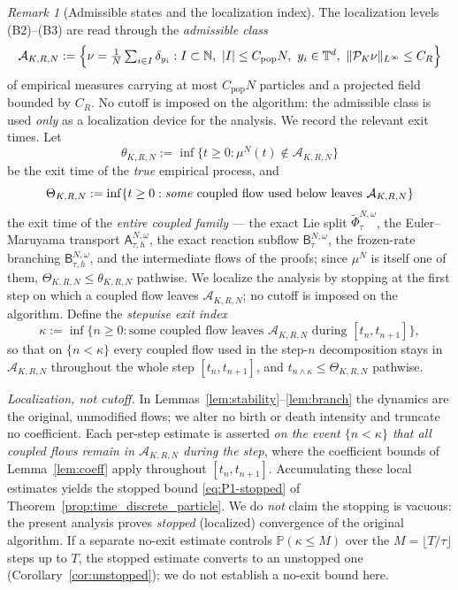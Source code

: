\documentclass[a4paper,fleqn]{cas-sc}
\theoremstyle{definition}
\theoremstyle{remark}
\newtheorem{remark}[theorem]{Remark}
\begin{document}
\begin{remark}[Admissible states and the localization index]\label{rem:admissible}
The localization levels (B2)--(B3) are read through the \emph{admissible class}
\[
\mathcal A_{K,R,N}:=\Bigl\{\nu=\tfrac1N\textstyle\sum_{i\in I}\delta_{y_i}:
I\subset\mathbb N,\ |I|\le C_{\mathrm{pop}}N,\ y_i\in\mathbb T^d,\ \|\mathcal P_K\nu\|_{L^\infty}\le C_R\Bigr\}
\]
of empirical measures carrying at most $C_{\mathrm{pop}}N$ particles and a projected field bounded
by $C_R$. No cutoff is imposed on the algorithm: the admissible class is used \emph{only} as a
localization device for the analysis. We record the relevant exit times. Let
\[
\theta_{K,R,N}:=\inf\{t\ge0:\mu^N(t)\notin\mathcal A_{K,R,N}\}
\]
be the exit time of the \emph{true} empirical process, and
\[
\Theta_{K,R,N}:=\inf\{t\ge0:\text{\emph{some} coupled flow used below leaves }\mathcal A_{K,R,N}\}
\]
the exit time of the \emph{entire coupled family} --- the exact Lie split
$\widetilde\Phi^{N,\omega}_\tau$, the Euler--Maruyama transport $\mathsf A^{N,\omega}_{\tau,h}$,
the exact reaction subflow $\mathsf B^{N,\omega}_\tau$, the frozen-rate branching
$\mathsf B^{N,\omega}_{\tau,h}$, and the intermediate flows of the proofs; since $\mu^N$ is itself
one of them, $\Theta_{K,R,N}\le\theta_{K,R,N}$ pathwise. We localize the analysis by stopping at the
first step on which a coupled flow leaves $\mathcal A_{K,R,N}$; no cutoff is imposed on the algorithm.
Define the \emph{stepwise exit index}
\begin{equation}\label{eq:kappa}
\kappa:=\inf\{n\ge0:\text{some coupled flow leaves }\mathcal A_{K,R,N}\text{ during }[t_n,t_{n+1}]\},
\end{equation}
so that on $\{n<\kappa\}$ every coupled flow used in the step-$n$ decomposition stays in
$\mathcal A_{K,R,N}$ throughout the whole step $[t_n,t_{n+1}]$, and $t_{n\wedge\kappa}\le\Theta_{K,R,N}$
pathwise.

\emph{Localization, not cutoff.} In Lemmas~\ref{lem:stability}--\ref{lem:branch} the dynamics are the
original, unmodified flows; we alter no birth or death intensity and truncate no coefficient. Each
per-step estimate is asserted \emph{on the event $\{n<\kappa\}$ that all coupled flows remain in
$\mathcal A_{K,R,N}$ during the step}, where the coefficient bounds of Lemma~\ref{lem:coeff} apply
throughout $[t_n,t_{n+1}]$. Accumulating these local estimates yields the stopped bound
\eqref{eq:P1-stopped} of Theorem~\ref{prop:time_discrete_particle}. We do \emph{not} claim the stopping
is vacuous: the present analysis proves \emph{stopped} (localized) convergence of the original
algorithm. If a separate no-exit estimate controls $\mathbb P(\kappa\le M)$ over the
$M=\lfloor T/\tau\rfloor$ steps up to $T$, the stopped estimate converts to an unstopped one
(Corollary~\ref{cor:unstopped}); we do not establish a no-exit bound here.
\end{remark}
\end{document}

